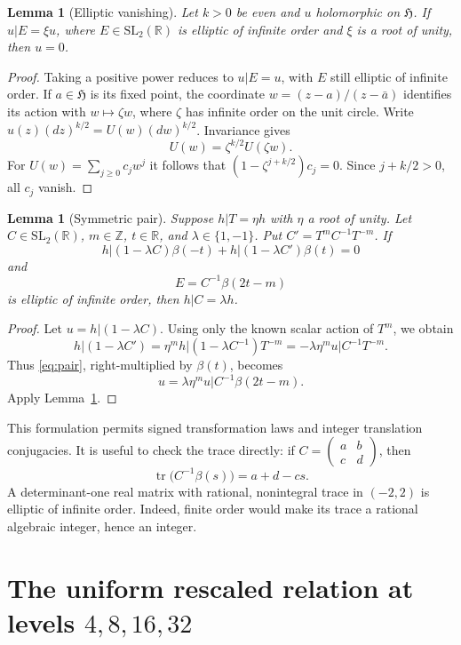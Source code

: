\documentclass[11pt]{article}
\newtheorem{lemma}[theorem]{Lemma}
\theoremstyle{remark}
\newcommand{\HH}{\mathfrak H}
\newcommand{\SL}{\mathrm{SL}}
\newcommand{\bb}{\beta}
\newcommand{\tr}{\operatorname{tr}}
\begin{document}
\begin{lemma}[Elliptic vanishing]\label{lem:vanish}
Let $k>0$ be even and $u$ holomorphic on $\HH$. If
$u|E=\xi u$, where $E\in\SL_2(\mathbb R)$ is elliptic of infinite
order and $\xi$ is a root of unity, then $u=0$.
\end{lemma}
\begin{proof}
Taking a positive power reduces to $u|E=u$, with $E$ still elliptic
of infinite order. If $a\in\HH$ is its fixed point, the coordinate
$w=(z-a)/(z-\bar a)$ identifies its action with $w\mapsto\zeta w$,
where $\zeta$ has infinite order on the unit circle. Write
$u(z)(dz)^{k/2}=U(w)(dw)^{k/2}$. Invariance gives
\[
 U(w)=\zeta^{k/2}U(\zeta w).
\]
For $U(w)=\sum_{j\geq0}c_jw^j$ it follows that
$(1-\zeta^{j+k/2})c_j=0$. Since $j+k/2>0$, all $c_j$ vanish.
\end{proof}

\begin{lemma}[Symmetric pair]\label{lem:pair}
Suppose $h|T=\eta h$ with $\eta$ a root of unity. Let
$C\in\SL_2(\mathbb R)$, $m\in\mathbb Z$, $t\in\mathbb R$, and
$\lambda\in\{1,-1\}$. Put $C'=T^mC^{-1}T^{-m}$.
If
\begin{equation}\label{eq:pair}
 h|(1-\lambda C)\bb(-t)+h|(1-\lambda C')\bb(t)=0
\end{equation}
and
\[
 E=C^{-1}\bb(2t-m)
\]
is elliptic of infinite order, then $h|C=\lambda h$.
\end{lemma}
\begin{proof}
Let $u=h|(1-\lambda C)$. Using only the known scalar action of
$T^m$, we obtain
\[
 h|(1-\lambda C')
 =\eta^m h|(1-\lambda C^{-1})T^{-m}
 =-\lambda\eta^m u|C^{-1}T^{-m}.
\]
Thus \eqref{eq:pair}, right-multiplied by $\bb(t)$, becomes
\[
 u=\lambda\eta^m u|C^{-1}\bb(2t-m).
\]
Apply Lemma~\ref{lem:vanish}.
\end{proof}

This formulation permits signed transformation laws and integer
translation conjugacies. It is useful to check the trace directly:
if $C=\left(\begin{smallmatrix}a&b\\c&d\end{smallmatrix}\right)$, then
\[
 \tr\bigl(C^{-1}\bb(s)\bigr)=a+d-cs.
\]
A determinant-one real matrix with rational, nonintegral trace in
$(-2,2)$ is elliptic of infinite order. Indeed, finite order would make
its trace a rational algebraic integer, hence an integer.

\section{The uniform rescaled relation at levels \texorpdfstring{$4,8,16,32$}{4,8,16,32}}
\end{document}
